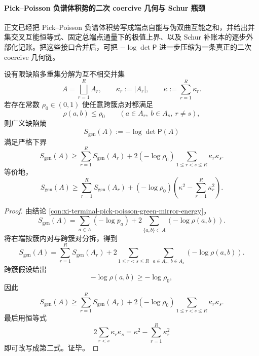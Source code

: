 \paragraph{Pick--Poisson 负谱体积势的二次 coercive 几何与 Schur 瓶颈}
正文已经把 Pick--Poisson 负谱体积势写成端点自能与伪双曲互能之和，并给出并集交叉互能恒等式、固定总端点通量下的极值上界、以及 Schur 补账本的逐步外部化记账。把这些接口合并后，可把 \(-\log\det \mathsf P\) 进一步压缩为一条真正的二次 coercive 几何链。

\begin{theorem}[分簇缺陷能量的二次强制下界]\label{thm:derived-pick-poisson-clustered-quadratic-coercive-lower-bound}
设有限缺陷多重集分解为互不相交并集
\[
A=\bigsqcup_{r=1}^{R}A_r,
\qquad
\kappa_r:=|A_r|,
\qquad
\kappa:=\sum_{r=1}^{R}\kappa_r.
\]
若存在常数 \(\rho_0\in(0,1)\) 使任意跨簇点对都满足
\[
\rho(a,b)\le \rho_0
\qquad
(a\in A_r,\ b\in A_s,\ r\neq s),
\]
则广义缺陷熵
\[
S_{\mathrm{gen}}(A):=-\log\det\mathsf P(A)
\]
满足严格下界
\[
S_{\mathrm{gen}}(A)
\ge
\sum_{r=1}^{R}S_{\mathrm{gen}}(A_r)
+2(-\log\rho_0)\sum_{1\le r<s\le R}\kappa_r\kappa_s.
\]
等价地，
\[
S_{\mathrm{gen}}(A)
\ge
\sum_{r=1}^{R}S_{\mathrm{gen}}(A_r)
+(-\log\rho_0)\left(\kappa^2-\sum_{r=1}^{R}\kappa_r^2\right).
\]
\end{theorem}
\begin{proof}
由结论 \ref{con:xi-terminal-pick-poisson-green-mirror-energy}，
\[
S_{\mathrm{gen}}(A)
=
\sum_{a\in A}(-\log p_a)
+2\sum_{\{a,b\}\subset A}(-\log\rho(a,b)).
\]
将右端按簇内对与跨簇对分拆，得到
\[
S_{\mathrm{gen}}(A)
=
\sum_{r=1}^{R}S_{\mathrm{gen}}(A_r)
+2\sum_{1\le r<s\le R}\ \sum_{a\in A_r,\ b\in A_s}(-\log\rho(a,b)).
\]
跨簇假设给出
\[
-\log\rho(a,b)\ge -\log\rho_0,
\]
因此
\[
S_{\mathrm{gen}}(A)
\ge
\sum_{r=1}^{R}S_{\mathrm{gen}}(A_r)
+2(-\log\rho_0)\sum_{1\le r<s\le R}\kappa_r\kappa_s.
\]
最后用恒等式
\[
2\sum_{r<s}\kappa_r\kappa_s=\kappa^2-\sum_{r=1}^{R}\kappa_r^2
\]
即可改写成第二式。证毕。
\end{proof}

